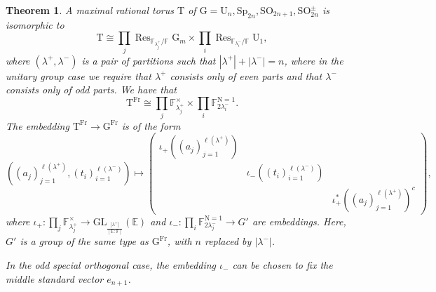 \documentclass[12pt, reqno]{amsart}
\newtheorem{theorem}{Theorem}[section]
\theoremstyle{definition}
\theoremstyle{definition}
\theoremstyle{definition}
\newcommand{\multiplicativegroup}[1]{#1^{\times}}
\newcommand{\lengthof}{\ell}
\newcommand{\sizeof}[1]{\left|#1\right|}
\newcommand{\grpIndex}[2]{\left[#1:#2\right]}
\newcommand{\involution}[1]{#1^{c}}
\newcommand{\GL}{\mathrm{GL}}
\newcommand{\SO}{\mathrm{SO}}
\newcommand{\Sp}{\mathrm{Sp}}
\newcommand{\UnitaryGroup}{\mathrm{U}}
\newcommand{\aFieldNorm}{\mathrm{N}}
\newcommand{\finiteField}{\mathbb{F}}
\newcommand{\quadraticExtension}{\mathbb{E}}
\newcommand{\finiteFieldExtension}[1]{\finiteField_{#1}}
\newcommand{\NormOneGroup}[1]{\finiteFieldExtension{#1}^{\aFieldNorm = 1}}
\newcommand{\Frobenius}{\operatorname{Fr}}
\newcommand{\restrictionOfScalars}[3]{\operatorname{Res}_{#1 \slash #2}{#3}}
\newcommand{\multiplcativeScheme}{\algebraicGroup{G}_m}
\newcommand{\algebraicGroup}[1]{\boldsymbol{\mathrm{#1}}}
\begin{document}
	\begin{theorem}
		A maximal rational torus $\algebraicGroup{T}$ of $\algebraicGroup{G} = \algebraicGroup{\UnitaryGroup}_{n}, \algebraicGroup{\Sp}_{2n}, \algebraicGroup{\SO}_{2n + 1}, \algebraicGroup{\SO}_{2n}^{\pm}$ is isomorphic to $$\algebraicGroup{T} \cong \prod_{j} \restrictionOfScalars{\finiteFieldExtension{\lambda^+_j}}{\finiteField}{\multiplcativeScheme} \times \prod_{i} \restrictionOfScalars{\finiteFieldExtension{\lambda^-_i}}{\finiteField}{\algebraicGroup{\UnitaryGroup}_1},$$
		where $\left(\lambda^+, \lambda^-\right)$ is a pair of partitions such that $\sizeof{\lambda^+} + \sizeof{\lambda^-} = n$, where in the unitary group case we require that $\lambda^+$ consists only of even parts and that $\lambda^-$ consists only of odd parts. We have that $$\algebraicGroup{T}^{\Frobenius} \cong \prod_{j} \multiplicativegroup{\finiteFieldExtension{\lambda_j^+}} \times \prod_{i} \NormOneGroup{2 \lambda_i^{-}}.$$ The embedding $\algebraicGroup{T}^{\Frobenius} \to \algebraicGroup{G}^{\Frobenius}$ is of the form $$\left(\left(a_j\right)_{j=1}^{\lengthof\left(\lambda^+\right)}, \left(t_i\right)_{i=1}^{\lengthof\left(\lambda^-\right)}\right) \mapsto
		\begin{pmatrix}
			\iota_+\left( \left(a_j\right)_{j=1}^{\lengthof\left(\lambda^+\right)}\right)\\
			& \iota_{-}\left( \left(t_i\right)_{i=1}^{\lengthof\left(\lambda^-\right)}
			 \right) &\\
			 & & \involution{\iota_+^{\ast}\left( \left(a_j\right)_{j=1}^{\lengthof\left(\lambda^+\right)}\right)}
		\end{pmatrix},$$
		where $\iota_+ \colon \prod_{j} \multiplicativegroup{\finiteFieldExtension{\lambda_j^+}} \to \GL_{\frac{\sizeof{\lambda^+}}{\grpIndex{\quadraticExtension}{\finiteField}}}\left(\quadraticExtension\right)$ and $\iota_- \colon \prod_{i} \NormOneGroup{2 \lambda_j^-} \to G'$ are embeddings. Here, $G'$ is a group of the same type as $\algebraicGroup{G}^{\Frobenius}$, with $n$ replaced by $\sizeof{\lambda^{-}}$.
		
		In the odd special orthogonal case, the embedding $\iota_{-}$ can be chosen to fix the middle standard vector $e_{n+1}$.
	\end{theorem}
    
\end{document}

